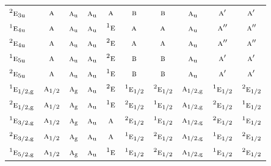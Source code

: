 \documentclass[10pt,a4paper]{article}
\numberwithin{equation}{section}
\newcommand{\irr}[1]{\text{\normalfont\scshape #1}}
\newcommand{\conjpair}[1]{{}^{#1}}
\newcommand{\ptag}[1]{\mathrm{#1}}
\begin{document}
{\begin{longtable}{@{}lccccccccc@{}}
$\conjpair{2}\irr{e}_{3\ptag{u}}$ & $\irr{a}$ & $\irr{a}_{\ptag{u}}$ & $\irr{a}_{\ptag{u}}$ & $\irr{a}$ & $\irr{b}$ & $\irr{b}$ & $\irr{a}_{\ptag{u}}$ & $\irr{a}'$ & $\irr{a}'$\\
$\conjpair{1}\irr{e}_{4\ptag{u}}$ & $\irr{a}$ & $\irr{a}_{\ptag{u}}$ & $\irr{a}_{\ptag{u}}$ & $\conjpair{1}\irr{e}$ & $\irr{a}$ & $\irr{a}$ & $\irr{a}_{\ptag{u}}$ & $\irr{a}''$ & $\irr{a}''$\\
$\conjpair{2}\irr{e}_{4\ptag{u}}$ & $\irr{a}$ & $\irr{a}_{\ptag{u}}$ & $\irr{a}_{\ptag{u}}$ & $\conjpair{2}\irr{e}$ & $\irr{a}$ & $\irr{a}$ & $\irr{a}_{\ptag{u}}$ & $\irr{a}''$ & $\irr{a}''$\\
$\conjpair{1}\irr{e}_{5\ptag{u}}$ & $\irr{a}$ & $\irr{a}_{\ptag{u}}$ & $\irr{a}_{\ptag{u}}$ & $\conjpair{2}\irr{e}$ & $\irr{b}$ & $\irr{b}$ & $\irr{a}_{\ptag{u}}$ & $\irr{a}'$ & $\irr{a}'$\\
$\conjpair{2}\irr{e}_{5\ptag{u}}$ & $\irr{a}$ & $\irr{a}_{\ptag{u}}$ & $\irr{a}_{\ptag{u}}$ & $\conjpair{1}\irr{e}$ & $\irr{b}$ & $\irr{b}$ & $\irr{a}_{\ptag{u}}$ & $\irr{a}'$ & $\irr{a}'$\\
$\conjpair{1}\irr{e}_{1/2,\ptag{g}}$ & $\irr{a}_{1/2}$ & $\irr{a}_{\ptag{g}}$ & $\irr{a}_{\ptag{u}}$ & $\conjpair{2}\irr{e}$ & $\conjpair{1}\irr{e}_{1/2}$ & $\conjpair{2}\irr{e}_{1/2}$ & $\irr{a}_{1/2,\ptag{g}}$ & $\conjpair{1}\irr{e}_{1/2}$ & $\conjpair{2}\irr{e}_{1/2}$\\
$\conjpair{2}\irr{e}_{1/2,\ptag{g}}$ & $\irr{a}_{1/2}$ & $\irr{a}_{\ptag{g}}$ & $\irr{a}_{\ptag{u}}$ & $\conjpair{1}\irr{e}$ & $\conjpair{2}\irr{e}_{1/2}$ & $\conjpair{1}\irr{e}_{1/2}$ & $\irr{a}_{1/2,\ptag{g}}$ & $\conjpair{2}\irr{e}_{1/2}$ & $\conjpair{1}\irr{e}_{1/2}$\\
$\conjpair{1}\irr{e}_{3/2,\ptag{g}}$ & $\irr{a}_{1/2}$ & $\irr{a}_{\ptag{g}}$ & $\irr{a}_{\ptag{u}}$ & $\irr{a}$ & $\conjpair{2}\irr{e}_{1/2}$ & $\conjpair{1}\irr{e}_{1/2}$ & $\irr{a}_{1/2,\ptag{g}}$ & $\conjpair{2}\irr{e}_{1/2}$ & $\conjpair{1}\irr{e}_{1/2}$\\
$\conjpair{2}\irr{e}_{3/2,\ptag{g}}$ & $\irr{a}_{1/2}$ & $\irr{a}_{\ptag{g}}$ & $\irr{a}_{\ptag{u}}$ & $\irr{a}$ & $\conjpair{1}\irr{e}_{1/2}$ & $\conjpair{2}\irr{e}_{1/2}$ & $\irr{a}_{1/2,\ptag{g}}$ & $\conjpair{1}\irr{e}_{1/2}$ & $\conjpair{2}\irr{e}_{1/2}$\\
$\conjpair{1}\irr{e}_{5/2,\ptag{g}}$ & $\irr{a}_{1/2}$ & $\irr{a}_{\ptag{g}}$ & $\irr{a}_{\ptag{u}}$ & $\conjpair{1}\irr{e}$ & $\conjpair{1}\irr{e}_{1/2}$ & $\conjpair{2}\irr{e}_{1/2}$ & $\irr{a}_{1/2,\ptag{g}}$ & $\conjpair{1}\irr{e}_{1/2}$ & $\conjpair{2}\irr{e}_{1/2}$\\

\end{longtable}}
\end{document}
